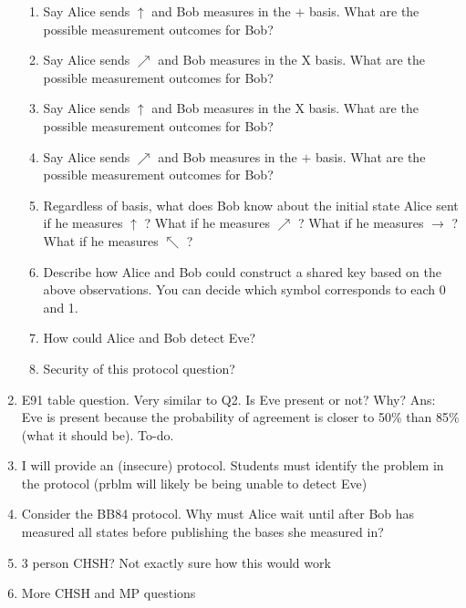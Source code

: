 \documentclass[12pt]{article}
\begin{document}
\begin{enumerate}[font=\bfseries]
        \begin{enumerate}
            \item Say Alice sends $\uparrow$ and Bob measures in the $+$ basis. What are the possible measurement outcomes for Bob?
            \item Say Alice sends $\nearrow$ and Bob measures in the X basis. What are the possible measurement outcomes for Bob?
            \item Say Alice sends $\uparrow$ and Bob measures in the X basis. What are the possible measurement outcomes for Bob?
            \item Say Alice sends $\nearrow$ and Bob measures in the $+$ basis. What are the possible measurement outcomes for Bob?
            \item Regardless of basis, what does Bob know about the initial state Alice sent if he measures $\uparrow$ ? What if he measures $\nearrow$ ? What if he measures  $\rightarrow$ ? What if he measures $\nwarrow$ ?
            \item Describe how Alice and Bob could construct a shared key based on the above observations. You can decide which symbol corresponds to each 0 and 1. 
            \item How could Alice and Bob detect Eve?
            \item Security of this protocol question?
        \end{enumerate}
    \item E91 table question. Very similar to Q2. Is Eve present or not? Why? Ans: Eve is present because the probability of agreement is closer to 50\% than 85\% (what it should be). To-do.
    \item I will provide an (insecure) protocol. Students must identify the problem in the protocol (prblm will likely be being unable to detect Eve)
    \item Consider the BB84 protocol. Why must Alice wait until after Bob has measured all states before publishing the bases she measured in?
    \item 3 person CHSH? Not exactly sure how this would work
    \item More CHSH and MP questions
\end{enumerate}
\end{document}
